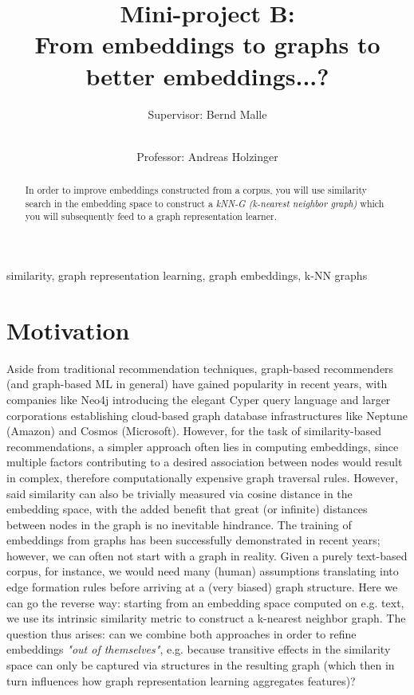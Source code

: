 \documentclass[review]{elsarticle}
\begin{document}
\begin{frontmatter}

\title{Mini-project B: \\ From embeddings to graphs to better embeddings...? }

\author[TUG,MUG]{Supervisor: Bernd Malle}
\author[TUG,MUG]{\small \\Professor: Andreas Holzinger}

\address[TUG]{Graz University of Technology, Austria}
\address[MUG]{Medical University Graz, Austria}


\begin{abstract}

In order to improve embeddings constructed from a corpus, you will use similarity search in the embedding space to construct a \textit{kNN-G (k-nearest neighbor graph)} which you will subsequently feed to a graph representation learner.

\end{abstract}

\begin{keyword}
similarity, graph representation learning, graph embeddings, k-NN graphs 
\end{keyword}

\end{frontmatter}


\section{Motivation}
\label{sect:motivation}

Aside from traditional recommendation techniques, graph-based recommenders (and graph-based ML in general) have gained popularity in recent years, with companies like Neo4j introducing the elegant Cyper query language and larger corporations establishing cloud-based graph database infrastructures like Neptune (Amazon) and Cosmos (Microsoft). However, for the task of similarity-based recommendations, a simpler approach often lies in computing embeddings, since multiple factors contributing to a desired association between nodes would result in complex, therefore computationally expensive graph traversal rules. However, said similarity can also be trivially measured via cosine distance in the embedding space, with the added benefit that great (or infinite) distances between nodes in the graph is no inevitable hindrance. The training of embeddings from graphs has been successfully demonstrated in recent years; however, we can often not start with a graph in reality. Given a purely text-based corpus, for instance, we would need many (human) assumptions translating into edge formation rules before arriving at a (very biased) graph structure. Here we can go the reverse way: starting from an embedding space computed on e.g. text, we use its intrinsic similarity metric to construct a k-nearest neighbor graph. The question thus arises: can we combine both approaches in order to refine embeddings \textit{"out of themselves"}, e.g. because transitive effects in the similarity space can only be captured via structures in the resulting graph (which then in turn influences how graph representation learning aggregates features)?
\end{document}
